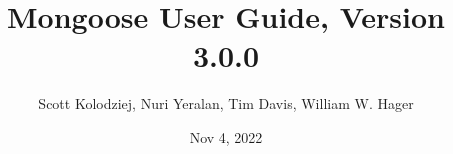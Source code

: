 \title{Mongoose User Guide, Version 3.0.0}
\author{Scott Kolodziej, Nuri Yeralan, Tim Davis, William W. Hager}
\date{Nov 4, 2022}
